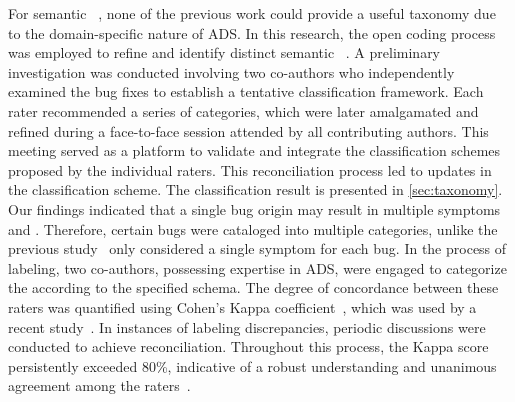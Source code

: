 For semantic \bfps ~, none of the previous work could provide a useful taxonomy due to the domain-specific nature of ADS. In this research, the open coding process was employed to refine and identify distinct semantic \bfps~.
A preliminary investigation was conducted involving two co-authors who independently examined the bug fixes to establish a tentative classification framework. Each rater recommended a series of categories, which were later amalgamated and refined during a face-to-face session attended by all contributing authors. This meeting served as a platform to validate and integrate the classification schemes proposed by the individual raters. This reconciliation process led to updates in the classification scheme. 
The classification result is presented in \autoref{sec:taxonomy}.
Our findings indicated that a single bug origin may result in multiple symptoms and \bfps. Therefore, certain bugs were cataloged into multiple categories, unlike the previous study~\cite{GarciaF0AXC20} only considered a single symptom for each bug.
In the process of labeling, two co-authors, possessing expertise in ADS, were engaged to categorize the \bfps according to the specified schema. 
The degree of concordance between these raters was quantified using Cohen's Kappa coefficient~\cite{VieiraKS10}, which was used by a recent \bfp study~\cite{IslamPNR20}. 
In instances of labeling discrepancies, periodic discussions were conducted to achieve reconciliation. 
Throughout this process, the Kappa score persistently exceeded 80\%, indicative of a robust understanding and unanimous agreement among the raters~\cite{mchugh2012interrater}.
